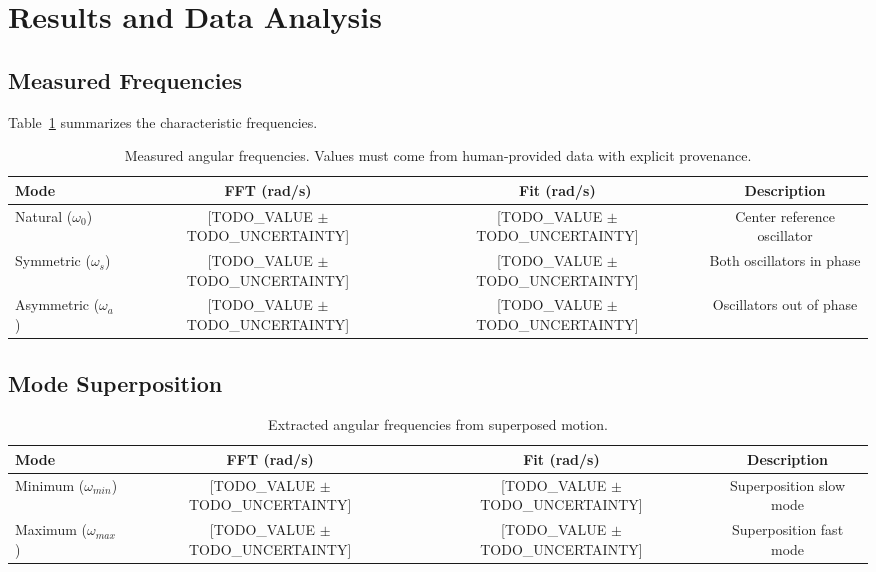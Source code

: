 \documentclass[a4paper,11pt]{article}
\begin{document}
\section{Results and Data Analysis}

\subsection{Measured Frequencies}
Table~\ref{tab:frequencies} summarizes the characteristic frequencies.

\begin{table}[H]
\centering
\begin{tabular}{lccc}
\toprule
\textbf{Mode} & \textbf{FFT (\unit{rad/s})} & \textbf{Fit (\unit{rad/s})} & \textbf{Description} \\
\midrule
Natural ($\omega_0$) & [TODO_VALUE $\pm$ TODO_UNCERTAINTY] & [TODO_VALUE $\pm$ TODO_UNCERTAINTY] & Center reference oscillator \\
Symmetric ($\omega_s$) & [TODO_VALUE $\pm$ TODO_UNCERTAINTY] & [TODO_VALUE $\pm$ TODO_UNCERTAINTY] & Both oscillators in phase \\
Asymmetric ($\omega_a$) & [TODO_VALUE $\pm$ TODO_UNCERTAINTY] & [TODO_VALUE $\pm$ TODO_UNCERTAINTY] & Oscillators out of phase \\
\bottomrule
\end{tabular}
\caption{Measured angular frequencies. Values must come from human-provided data with explicit provenance.}
\label{tab:frequencies}
\end{table}

\subsection{Mode Superposition}
\begin{table}[H]
\centering
\begin{tabular}{lccc}
\toprule
\textbf{Mode} & \textbf{FFT (\unit{rad/s})} & \textbf{Fit (\unit{rad/s})} & \textbf{Description} \\
\midrule
Minimum ($\omega_{min}$) & [TODO_VALUE $\pm$ TODO_UNCERTAINTY] & [TODO_VALUE $\pm$ TODO_UNCERTAINTY] & Superposition slow mode \\
Maximum ($\omega_{max}$) & [TODO_VALUE $\pm$ TODO_UNCERTAINTY] & [TODO_VALUE $\pm$ TODO_UNCERTAINTY] & Superposition fast mode \\
\bottomrule
\end{tabular}
\caption{Extracted angular frequencies from superposed motion.}
\label{tab:superposition_frequencies}
\end{table}
\end{document}
